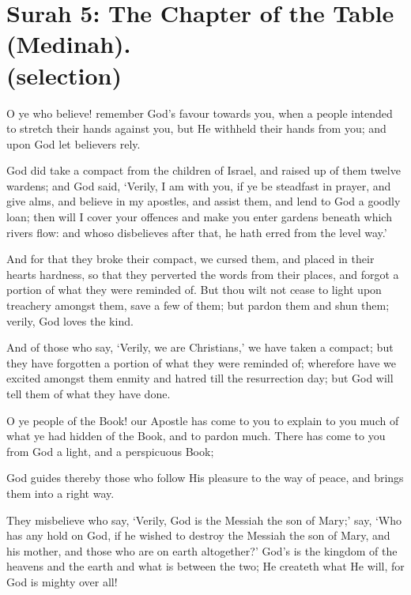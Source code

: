 \documentclass[fontsize=14pt, letterpaper, notitlepage, openany, DIV=12]{scrbook} %
\begin{document}
\section[Surah 5: The Chapter of the Table (Medinah).]{Surah 5: The Chapter of the Table (Medinah).\\ (selection)}


\noindent[5:11]
O ye who believe! remember God's favour towards you, when a people intended to
stretch their hands against you, but He withheld their hands from you; and upon God let
believers rely.

\noindent[5:12]
God did take a compact from the children of Israel, and raised up of them twelve
wardens; and God said, `Verily, I am with you, if ye be steadfast in prayer, and give alms, and
believe in my apostles, and assist them, and lend to God a goodly loan; then will I cover your
offences and make you enter gardens beneath which rivers flow: and whoso disbelieves after
that, he hath erred from the level way.'

\noindent[5:13]
And for that they broke their compact, we cursed them, and placed in their hearts
hardness, so that they perverted the words from their places, and forgot a portion of what they
were reminded of. But thou wilt not cease to light upon treachery amongst them, save a few of
them; but pardon them and shun them; verily, God loves the kind.

\noindent[5:14]
And of those who say, `Verily, we are Christians,' we have taken a compact; but they
have forgotten a portion of what they were reminded of; wherefore have we excited amongst
them enmity and hatred till the resurrection day; but God will tell them of what they have done.

\noindent[5:15]
O ye people of the Book! our Apostle has come to you to explain to you much of what ye
had hidden of the Book, and to pardon much. There has come to you from God a light, and a
perspicuous Book;

\noindent[5:16]
God guides thereby those who follow His pleasure to the way of peace, and brings them
into a right way.

\noindent[5:17]
They misbelieve who say, `Verily, God is the Messiah the son of Mary;' say, `Who has
any hold on God, if he wished to destroy the Messiah the son of Mary, and his mother, and those
who are on earth altogether?' God's is the kingdom of the heavens and the earth and what is
between the two; He createth what He will, for God is mighty over all!
\end{document}
